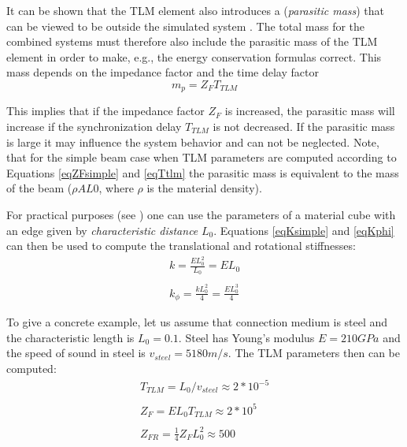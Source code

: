 It can be shown that the TLM element also introduces a (\emph{parasitic mass}) that can be viewed 
to be outside the simulated system \cite{KrusModMech-99}. The total mass for the combined systems must therefore also
include the parasitic mass of the TLM element in order to make, e.g., the energy conservation 
formulas correct. This mass depends on the impedance factor and the time delay factor
\begin{equation}
\label{eqMtlm}
m_p = Z_F T_{TLM}
\end{equation}

This implies that if the impedance factor $Z_F$  is increased, the parasitic mass will increase 
if the synchronization delay $T_{TLM}$ is not decreased. If the parasitic mass is large it may
influence the system behavior and can not be neglected. Note, that for the simple beam case
when TLM parameters are computed according to Equations \ref{eqZFsimple} and \ref{eqTtlm} the
parasitic mass is equivalent to the mass of the beam ($\rho A L0$, where $\rho$ is the material density).

For practical purposes (see \cite{Fritzson+Stahl+Nakhimovski-07}) one can use the parameters of a material cube with an edge
given by \emph{characteristic distance} $L_0$. Equations \ref{eqKsimple} and \ref{eqKphi} can then be used 
to compute the translational and rotational stiffnesses:
\begin{equation}
\begin{array}{l}
k = \frac{E L_0 ^2}{L_0} = E L_0 \\
\\
k_{\phi} = \frac{k L_0^2}{4} = \frac{E L_0^3}{4}
\end{array}
\end{equation}

To give a concrete example, let us assume that connection medium is steel
and the characteristic length is $L_0 = 0.1$. Steel has  Young's modulus 
$E = 210 GPa$ and the speed of sound in steel is $v_{steel}=5180 m/s$.
The TLM parameters then can be computed:
\begin{equation}
\begin{array}{l}
T_{TLM} = L_0 / v_{steel} \approx 2*10^{-5} \\
\\
Z_F =  E L_0 T_{TLM} \approx 2 * 10^5 \\
\\
Z_{FR} =  \frac{1}{4}Z_F L_0^2 \approx 500
\end{array}
\end{equation}

